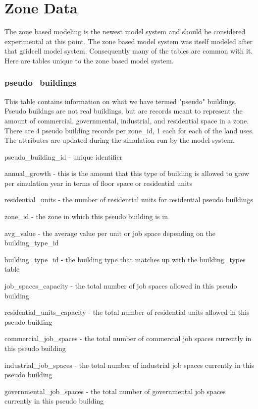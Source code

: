 \chapter{Zone Data}

The zone based modeling is the newest model system and should be considered experimental at this point.  The zone based model system was itself modeled after that gridcell model system.  Consequently many of the tables are common with it.  Here are tables unique to the zone based model system.

\subsection{pseudo\_buildings} 

This table contains information on what we have termed "pseudo" buildings.  Pseudo buildngs are not real buildings, but are records meant to represent the amount of commercial, governmental, industrial, and residential space in a zone.  There are 4 pseudo building records per zone\_id, 1 each for each of the land uses.  The attributes are updated during the simulation run by the model system.

\begin{description}
\item pseudo\_building\_id - unique identifier
\item annual\_growth - this is the amount that this type of building is allowed to grow per simulation year in terms of floor space or residential units
\item residential\_units - the number of residential units for residential pseudo buildings
\item zone\_id - the zone in which this pseudo building is in
\item avg\_value - the average value per unit or job space depending on the building\_type\_id
\item building\_type\_id - the building type that matches up with the building\_types table
\item job\_spaces\_capacity - the total number of job spaces allowed in this pseudo building
\item residential\_units\_capacity - the total number of residential units allowed in this pseudo building
\item commercial\_job\_spaces - the total number of commercial job spaces currently in this pseudo building
\item industrial\_job\_spaces - the total number of industrial job spaces currently in this pseudo building
\item governmental\_job\_spaces - the total number of governmental job spaces currently in this pseudo building
\end{description}